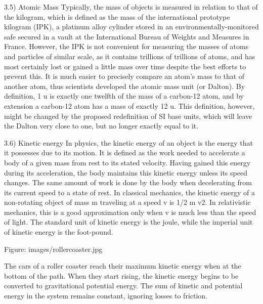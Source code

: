 \documentclass{book}
\begin{document}
    3.5) Atomic Mass
    Typically, the mass of objects is measured in relation to that of the kilogram, which is defined as the mass of the international prototype kilogram (IPK), a platinum alloy cylinder stored in an environmentally-monitored safe secured in a vault at the International Bureau of Weights and Measures in France. However, the IPK is not convenient for measuring the masses of atoms and particles of similar scale, as it contains trillions of trillions of atoms, and has most certainly lost or gained a little mass over time despite the best efforts to prevent this. It is much easier to precisely compare an atom's mass to that of another atom, thus scientists developed the atomic mass unit (or Dalton). By definition, 1 u is exactly one twelfth of the mass of a carbon-12 atom, and by extension a carbon-12 atom has a mass of exactly 12 u. This definition, however, might be changed by the proposed redefinition of SI base units, which will leave the Dalton very close to one, but no longer exactly equal to it.
    
    
    
    3.6) Kinetic energy
    In physics, the kinetic energy of an object is the energy that it possesses due to its motion. It is defined as the work needed to accelerate a body of a given mass from rest to its stated velocity. Having gained this energy during its acceleration, the body maintains this kinetic energy unless its speed changes. The same amount of work is done by the body when decelerating from its current speed to a state of rest. In classical mechanics, the kinetic energy of a non-rotating object of mass m traveling at a speed v is 1/2 m v2. In relativistic mechanics, this is a good approximation only when v is much less than the speed of light. The standard unit of kinetic energy is the joule, while the imperial unit of kinetic energy is the foot-pound.
        
    Figure: images/rollercoaster.jpg

    The cars of a roller coaster reach their maximum kinetic energy when at the bottom of the path. When they start rising, the kinetic energy begins to be converted to gravitational potential energy. The sum of kinetic and potential energy in the system remains constant, ignoring losses to friction.
\end{document}
